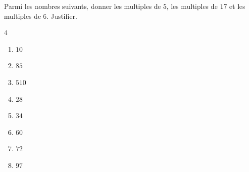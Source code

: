\begin{exo}{}
	Parmi les nombres suivants, donner les multiples de $5$, les multiples de $17$ et les multiples de $6$. Justifier.
	\vspace*{-2mm}\begin{multicols}{4}
		\begin{enumerate}
			\item $10$
			\item $85$
			\item $510$
			\item $28$
			\item $34$
			\item $60$
			\item $72$
			\item $97$
		\end{enumerate}
	\end{multicols}
\end{exo}
